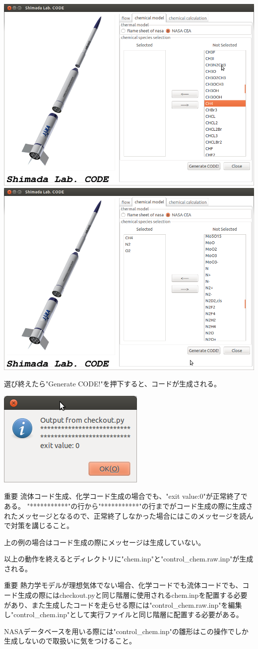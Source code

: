 \documentclass{jsarticle}
\begin{document}
\begin{center}
\includegraphics[width=.7\textwidth,bb=0 0 895 649]{tutorial_img/030.png}
\includegraphics[width=.7\textwidth,bb=0 0 895 649]{tutorial_img/035.png}
\end{center}
選び終えたら"Generate CODE!"を押下すると、コードが生成される。
\begin{center}
\includegraphics[width=.3\textwidth,bb=0 0 268 174]{tutorial_img/040.png}
\end{center}
\begin{itembox}[l]{重要}
流体コード生成、化学コード生成の場合でも、"exit value:0"が正常終了である。
"***********"の行から"***********"の行までがコード生成の際に生成されたメッセージとなるので、正常終了しなかった場合にはこのメッセージを読んで対策を講じること。
\end{itembox}
上の例の場合はコード生成の際にメッセージは生成していない。

以上の動作を終えるとディレクトリに"chem.inp"と"control\_chem.raw.inp"が生成される。
\begin{itembox}[l]{重要}
熱力学モデルが理想気体でない場合、化学コードでも流体コードでも、コード生成の際にはcheckout.pyと同じ階層に使用されるchem.inpを配置する必要があり、また生成したコードを走らせる際には"control\_chem.raw.inp"を編集し"control\_chem.inp"として実行ファイルと同じ階層に配置する必要がある。

NASAデータベースを用いる際には"control\_chem.inp"の雛形はこの操作でしか生成しないので取扱いに気をつけること。
\end{itembox}
\end{document}

